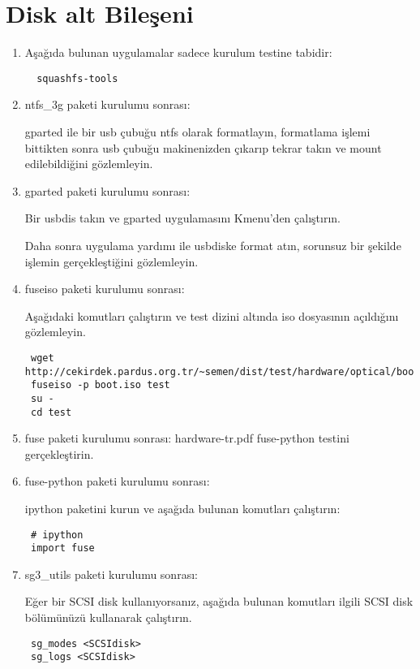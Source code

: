 \documentclass[a4paper,10pt]{article}
\begin{document}
\section{Disk alt Bileşeni}
\begin{enumerate}
 \item Aşağıda bulunan uygulamalar sadece kurulum testine tabidir:
\begin{verbatim}
  squashfs-tools
\end{verbatim}

\item ntfs\_3g paketi kurulumu sonrası:

gparted ile bir usb çubuğu ntfs olarak formatlayın, formatlama işlemi bittikten sonra usb çubuğu makinenizden çıkarıp tekrar takın ve mount edilebildiğini gözlemleyin. 

\item gparted paketi kurulumu sonrası:

Bir usbdis takın ve gparted uygulamasını Kmenu'den çalıştırın. 

Daha sonra uygulama yardımı ile usbdiske format atın, sorunsuz bir şekilde işlemin gerçekleştiğini gözlemleyin.
\item fuseiso paketi kurulumu sonrası:

Aşağıdaki komutları çalıştırın ve test dizini altında iso dosyasının açıldığını gözlemleyin.
\begin{verbatim}
 wget http://cekirdek.pardus.org.tr/~semen/dist/test/hardware/optical/boot.iso
 fuseiso -p boot.iso test
 su -
 cd test
\end{verbatim}

\item fuse paketi kurulumu sonrası:
hardware-tr.pdf fuse-python testini gerçekleştirin.

\item fuse-python paketi kurulumu sonrası:

ipython paketini kurun ve aşağıda bulunan komutları çalıştırın:
\begin{verbatim}
 # ipython
 import fuse
\end{verbatim}

\item sg3\_utils  paketi kurulumu sonrası:

Eğer bir SCSI disk kullanıyorsanız, aşağıda bulunan komutları ilgili SCSI disk bölümünüzü kullanarak çalıştırın.
\begin{verbatim}
 sg_modes <SCSIdisk>
 sg_logs <SCSIdisk>
\end{verbatim}


\end{enumerate}
\end{document}
